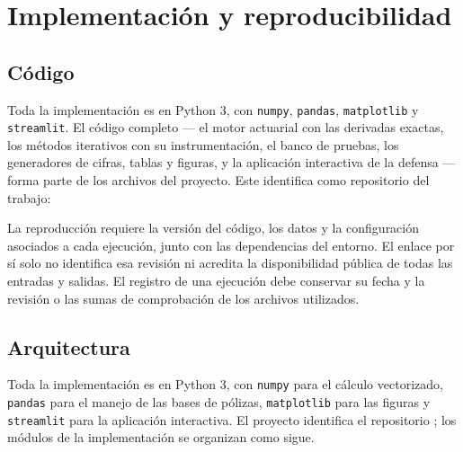 \chapter{Implementación y reproducibilidad}
\label{ap:software}

\section{Código}

Toda la implementación es en Python 3, con \texttt{numpy}, \texttt{pandas},
\texttt{matplotlib} y \texttt{streamlit}. El código completo --- el motor
actuarial con las derivadas exactas, los \datoNMetodos{} métodos iterativos con su
instrumentación, el banco de pruebas, los generadores de cifras, tablas y figuras,
y la aplicación interactiva de la defensa --- forma parte de los archivos del
proyecto. Este identifica como repositorio del trabajo:
\begin{center}
\repositorio
\end{center}
La reproducción requiere la versión del código, los datos y la configuración
asociados a cada ejecución, junto con las dependencias del entorno. El enlace por
sí solo no identifica esa revisión ni acredita la disponibilidad pública de todas
las entradas y salidas. El registro de una ejecución debe conservar su fecha y la
revisión o las sumas de comprobación de los archivos utilizados.

\iffalse
\section{Arquitectura}

Toda la implementación es en Python 3, con \texttt{numpy} para el cálculo
vectorizado, \texttt{pandas} para el manejo de las bases de pólizas,
\texttt{matplotlib} para las figuras y \texttt{streamlit} para la aplicación
interactiva. El proyecto identifica el repositorio \repositorio; los módulos de
la implementación se organizan como sigue.


